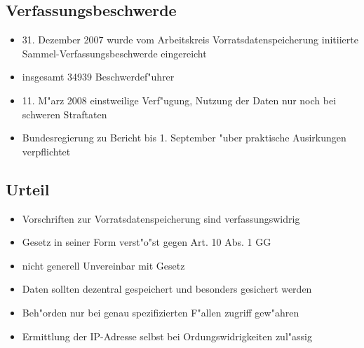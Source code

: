   \subsection{Verfassungsbeschwerde}
    \begin{frame}
      \begin{itemize}
        \item 31. Dezember 2007 wurde vom Arbeitskreis Vorratsdatenspeicherung initiierte Sammel-Verfassungsbeschwerde eingereicht
        \item insgesamt 34939 Beschwerdef"uhrer
        \item 11. M"arz 2008 einstweilige Verf"ugung, Nutzung der Daten nur noch bei schweren Straftaten
        \item Bundesregierung zu Bericht bis 1. September "uber praktische Ausirkungen verpflichtet
      \end{itemize}
    \end{frame}

  \subsection{Urteil}
    \begin{frame}
      \begin{itemize}
        \item Vorschriften zur Vorratsdatenspeicherung sind verfassungswidrig
        \item Gesetz in seiner Form verst"o"st gegen Art. 10 Abs. 1 GG
        \item nicht generell Unvereinbar mit Gesetz
        \item Daten sollten dezentral gespeichert und besonders gesichert werden
        \item Beh"orden nur bei genau spezifizierten F"allen zugriff gew"ahren
        \item Ermittlung der IP-Adresse selbst bei Ordungswidrigkeiten zul"assig
      \end{itemize}
    \end{frame}
